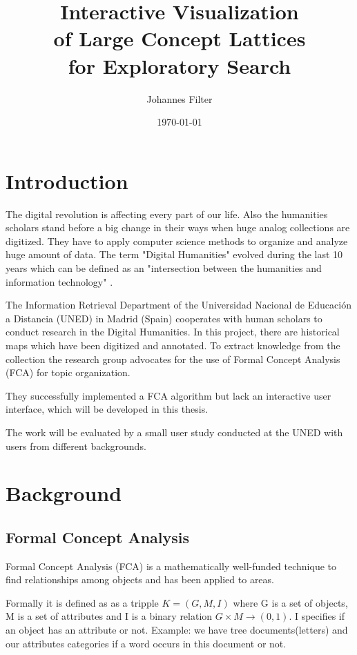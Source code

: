 \documentclass[11pt]{article}
\title{Interactive Visualization\\ of Large Concept Lattices\\for Exploratory Search}
\date{\today}
\author{Johannes Filter}
\begin{document}
\maketitle

\tableofcontents
\newpage

\section{Introduction}

The digital revolution is affecting every part of our life. Also the humanities scholars stand before a big change in their ways when huge analog collections are digitized. They have to apply computer science methods to organize and analyze huge amount of data. The term "Digital Humanities" evolved during the last 10 years which can be defined as an "intersection between the humanities and information technology" \cite{Svensson2010}.

 The Information Retrieval Department of the Universidad Nacional de Educación a Distancia (UNED) in Madrid (Spain) cooperates with human scholars to conduct research in the Digital Humanities. In this project, there are historical maps which have been digitized and annotated. To extract knowledge from the collection the research group advocates for the use of Formal Concept Analysis (FCA) for topic organization. \cite{Castellanos,Cigarran}
 
 They successfully implemented a FCA algorithm but lack an interactive user interface, which will be developed in this thesis. 
 
 The work will be evaluated by a small user study conducted at the UNED with users from different backgrounds.
 
\section{Background}

\subsection{Formal Concept Analysis}

Formal Concept Analysis (FCA) \cite{Ganter2012} is a mathematically well-funded technique to find relationships among objects and has been applied to areas\cite{Poelmans2013}.

Formally it is defined as as a tripple $K = (G, M, I)$ where G is a set of objects, M is a set of attributes and I is a binary relation $G \times M \rightarrow (0, 1)$. I specifies if an object has an attribute or not. Example: we have tree documents(letters) and our attributes categories if a word occurs in this document or not.
\end{document}
